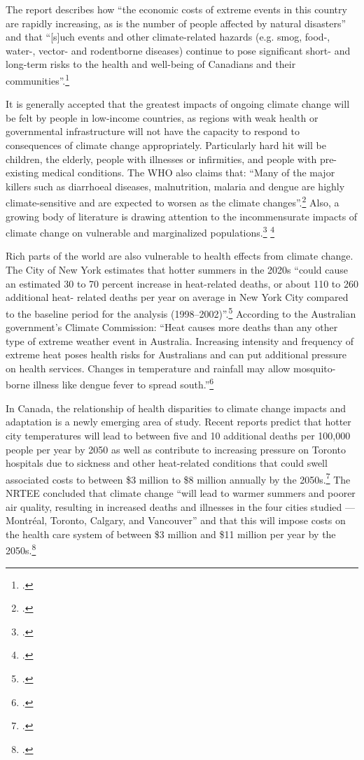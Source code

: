 The report describes how ``the economic costs of extreme events in this country are rapidly increasing, as is the number of people affected by natural disasters'' and that ``[s]uch events and other climate-related hazards (e.g. smog, food-, water-, vector- and rodentborne diseases) continue to pose significant short- and long-term risks to the health and well-being of Canadians and their communities''.\footcite[][p. 432]{HHInACC}



It is generally accepted that the greatest impacts of ongoing climate change will be felt by people in low-income countries, as regions with weak health or governmental infrastructure will not have the capacity to respond to consequences of climate change appropriately. 
Particularly hard hit will be children, the elderly, people with illnesses or infirmities, and people with pre-existing medical conditions. 
The WHO also claims that: ``Many of the major killers such as diarrhoeal diseases, malnutrition, malaria and dengue are highly climate-sensitive and are expected to worsen as the climate changes''.\footcite[][]{WHOCCandHealth2012}
Also, a growing body of literature is drawing attention to the incommensurate impacts of climate change on vulnerable and marginalized populations.\footcite[][p. 1693--1733]{Costello2009} \footcite[][]{WHOSocialDeterm}



Rich parts of the world are also vulnerable to health effects from climate change.
The City of New York estimates that hotter summers in the 2020s ``could cause an estimated 30 to 70 percent increase in heat-related deaths, or about 110 to 260 additional heat- related deaths per year on average in New York City compared to the baseline period for the analysis (1998–2002)''.\footcite[][p. 31]{ResilientNewYork}
According to the Australian government's Climate Commission: ``Heat causes more deaths than any other type of extreme weather event in Australia. Increasing intensity and frequency of extreme heat poses health risks for Australians and can put additional pressure on health services. Changes in temperature and rainfall may allow mosquito-borne illness like dengue fever to spread south.''\footcite[][p. 4]{CriticalDecade2013}



In Canada, the relationship of health disparities to climate change impacts and adaptation is a newly emerging area of study. 
Recent reports predict that hotter city temperatures will lead to between five and 10 additional deaths per 100,000 people per year by 2050 as well as contribute to increasing pressure on Toronto hospitals due to sickness and other heat-related conditions that could swell associated costs to between \$3 million to \$8 million annually by the 2050s.\footcite[][p. 87]{NRTEEPrice}
The NRTEE concluded that climate change ``will lead to warmer summers and poorer air quality, resulting in increased deaths and illnesses in the four cities studied — Montréal, Toronto, Calgary, and Vancouver'' and that this will impose costs on the health care system of between \$3 million and \$11 million per year by the 2050s.\footcite[][p. 16]{NRTEEPrice}



